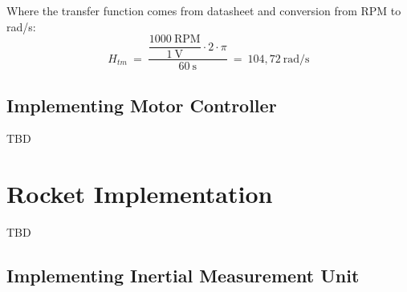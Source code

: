 Where the transfer function comes from datasheet and conversion from RPM to rad/s:
\begin{equation}
H_{tm}\ =\ \dfrac{\dfrac{1000\ \text{RPM}}{1\ \text{V}} \cdot 2 \cdot \pi}{60\ \text{s}}\ =\ 104,72\ \text{rad/s}
\end{equation}

\subsection{Implementing Motor Controller}
TBD


\section{Rocket Implementation}
TBD

\subsection{Implementing Inertial Measurement Unit}